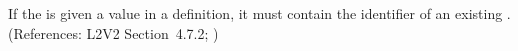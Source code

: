 If the   is given a value in a \Compartment
definition, it must contain the identifier of an existing \CompartmentType.
(References: L2V2 Section~4.7.2; )
